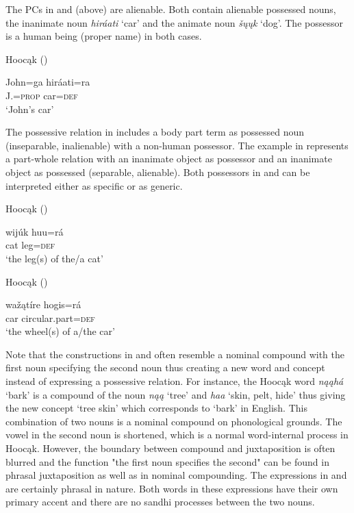 \documentclass[output=paper]{LSP/langsci}
\begin{document}
The PCs in  and  (above) are alienable. Both contain alienable possessed nouns, the inanimate noun \textit{hiráati} `car' and the animate noun \textit{šųųk} `dog'. The possessor is a human being (proper name) in both cases. 

\ea Hoocąk (\citealt[13]{Helmbrecht2003}) \label{johnscar}

\gll John=ga      hiráati=ra \\
J.=\textsc{prop} car=\textsc{def} \\
\glt `John's car'
\z

The possessive relation in  includes a body part term as possessed noun (inseparable, inalienable) with a non-human possessor. The example in  represents a part-whole relation with an inanimate object as possessor and an inanimate object as possessed (separable, alienable). Both possessors in  and  can be interpreted either as specific or as generic. 

\ea Hoocąk (\citealt[13]{Helmbrecht2003}) \label{leg}

\gll wijúk huu=rá \\
cat      leg=\textsc{def} \\
\glt `the leg(s) of the/a cat'
\z

\ea Hooc\k{a}k (\citealt[13]{Helmbrecht2003}) \label{wheel}

\gll waž\k{a}tíre hogis=rá \\
car  circular.part=\textsc{def} \\
\glt `the wheel(s) of a/the car'
\z

Note that the constructions in  and  often resemble a nominal compound with the first noun specifying the second noun thus creating a new word and concept instead of expressing a possessive relation. For instance, the Hoocąk word \textit{n\k{a}\k{a}h\'a} `bark' is a compound of the noun \textit{n\k{a}\k{a}} `tree' and \textit{haa} `skin, pelt, hide' thus giving the new concept `tree skin' which corresponds to `bark' in English. This combination of two nouns is a nominal compound on phonological grounds. The vowel in the second noun is shortened, which is a normal word-internal process in Hoocąk. However, the boundary between compound and juxtaposition is often blurred and the function "the first noun specifies the second" can be found in phrasal juxtaposition as well as in nominal compounding. The expressions in  and  are certainly phrasal in nature. Both words in these expressions have their own primary accent and there are no sandhi processes between the two nouns. 
\end{document}

